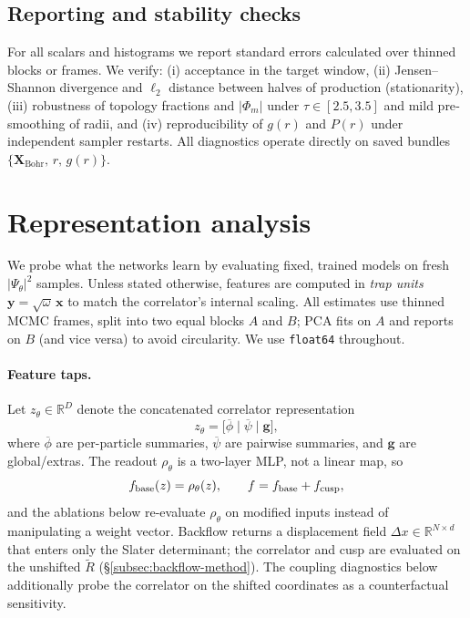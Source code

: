 \subsection{Reporting and stability checks}
\label{subsec:analysis-sanity}

For all scalars and histograms we report standard errors calculated over thinned blocks or frames.
We verify: 
(i) acceptance in the target window, 
(ii) Jensen–Shannon divergence and $\ell_2$ distance between halves of production (stationarity),
(iii) robustness of topology fractions and $|\Phi_m|$ under $\tau\in[2.5,3.5]$ and mild pre‐smoothing of radii, and
(iv) reproducibility of $g(r)$ and $P(r)$ under independent sampler restarts.
All diagnostics operate directly on saved bundles 
$\{\mathbf{X}_{\mathrm{Bohr}},\,r,\,g(r)\}$.

\section{Representation analysis}
\label{sec:repr-methods}

We probe what the networks learn by evaluating fixed, trained models on fresh
$|\Psi_\theta|^2$ samples. Unless stated otherwise, features are computed in \emph{trap units}
$\mathbf{y}=\sqrt{\omega}\,\mathbf{x}$ to match the correlator’s internal scaling.
All estimates use thinned MCMC frames, split into two equal blocks $A$ and $B$;
PCA fits on $A$ and reports on $B$ (and vice versa) to avoid circularity. 
We use \texttt{float64} throughout.

\paragraph{Feature taps.}
Let $z_\theta\in\mathbb{R}^D$ denote the concatenated correlator representation
\[
z_\theta=\big[\overline{\phi}\;\big|\;\overline{\psi}\;\big|\;\mathbf{g}\big],
\]
where $\overline{\phi}$ are per-particle summaries, $\overline{\psi}$ are pairwise summaries,
and $\mathbf{g}$ are global/extras. The readout $\rho_\theta$ is a two-layer MLP, not a linear
map, so
\begin{equation}
f_{\rm base}(z)=\rho_\theta(z),
\qquad
f=f_{\rm base}+f_{\rm cusp},
\end{equation}
and the ablations below re-evaluate $\rho_\theta$ on modified inputs instead of manipulating a weight vector.
Backflow returns a displacement field $\Delta x\in\mathbb{R}^{N\times d}$ that enters only the
Slater determinant; the correlator and cusp are evaluated on the unshifted $\tilde R$
(\S\ref{subsec:backflow-method}). The coupling diagnostics below additionally probe the
correlator on the shifted coordinates as a counterfactual sensitivity.

